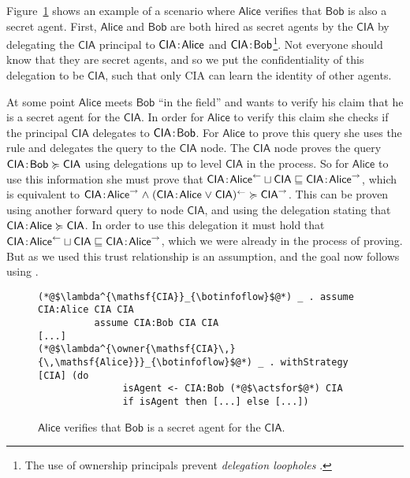 Figure~\ref{fig:govt-alice-checks-bob} shows an example of a scenario where $\mathsf{Alice}$ verifies that $\mathsf{Bob}$ is also a secret agent. First, $\mathsf{Alice}$ and $\mathsf{Bob}$ are both hired as secret agents by the $\mathsf{CIA}$ by delegating the $\mathsf{CIA}$ principal to $\mathsf{CIA}\!:\!\mathsf{Alice}$ and $\mathsf{CIA}\!:\!\mathsf{Bob}$\footnote{The use of ownership principals prevent \emph{delegation loopholes} \cite{Arden:2015:FA:2859845.2859998}.}. Not everyone should know that they are secret agents, and so we put the confidentiality of this delegation to be $\mathsf{CIA}$, such that only CIA can learn the identity of other agents.

At some point $\mathsf{Alice}$ meets $\mathsf{Bob}$ ``in the field'' and wants to verify his claim that he is a secret agent for the $\mathsf{CIA}$. In order for $\mathsf{Alice}$ to verify this claim she checks if the principal $\mathsf{CIA}$ delegates to $\mathsf{CIA}\!:\!\mathsf{Bob}$. For $\mathsf{Alice}$ to prove this query she uses the  rule and delegates the query to the $\mathsf{CIA}$ node. The $\mathsf{CIA}$ node proves the query $\mathsf{CIA}\!:\!\mathsf{Bob} \succcurlyeq \mathsf{CIA}$ using delegations up to level $\mathsf{CIA}$ in the process. So for $\mathsf{Alice}$ to use this information she must prove that $\mathsf{CIA}\!:\!\mathsf{Alice}^{\leftarrow} \sqcup \mathsf{CIA} \sqsubseteq \mathsf{CIA}\!:\!\mathsf{Alice}^{\rightarrow}$, which is equivalent to $\mathsf{CIA}\!:\!\mathsf{Alice}^{\rightarrow} \mathrel{\land} (\mathsf{CIA}\!:\!\mathsf{Alice} \mathrel{\lor} \mathsf{CIA})^{\leftarrow} \succcurlyeq \mathsf{CIA}^{\rightarrow}$. This can be proven using another forward query to node $\mathsf{CIA}$, and using the delegation stating that $\mathsf{CIA}\!:\!\mathsf{Alice} \succcurlyeq \mathsf{CIA}$. In order to use this delegation it must hold that $\mathsf{CIA}\!:\!\mathsf{Alice}^{\leftarrow} \sqcup \mathsf{CIA} \sqsubseteq \mathsf{CIA}\!:\!\mathsf{Alice}^{\rightarrow}$, which we were already in the process of proving. But as we used  this trust relationship is an assumption, and the goal now follows using .

\begin{figure}
\centering
\begin{lstlisting}
(*@$\lambda^{\mathsf{CIA}}_{\botinfoflow}$@*) _ . assume CIA:Alice CIA CIA
          assume CIA:Bob CIA CIA
[...]
(*@$\lambda^{\owner{\mathsf{CIA}\,}{\,\mathsf{Alice}}}_{\botinfoflow}$@*) _ . withStrategy [CIA] (do
               isAgent <- CIA:Bob (*@$\actsfor$@*) CIA
               if isAgent then [...] else [...])
\end{lstlisting}
\caption{$\mathsf{Alice}$ verifies that $\mathsf{Bob}$ is a secret agent for the $\mathsf{CIA}$.}
\label{fig:govt-alice-checks-bob}
\end{figure}